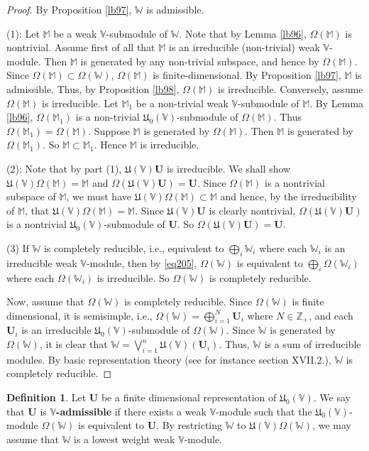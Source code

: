 \documentclass[12pt,b5paper,notitlepage]{report}
\theoremstyle{definition}
\newtheorem{df}{Definition}[section]
\theoremstyle{plain}
\newcommand{\fk}{\mathfrak}
\newcommand{\mbf}{\mathbf}
\newcommand{\Vbb}{\mathbb V}
\newcommand{\Wbb}{\mathbb W}
\newcommand{\Mbb}{\mathbb M}
\newcommand{\Zbb}{\mathbb Z}
\numberwithin{equation}{section}
\begin{document}
\begin{proof}
By Proposition \ref{lb97}, $\Wbb$ is admissible.

(1): Let $\Mbb$ be a weak $\Vbb$-submodule of $\Wbb$. Note that by Lemma \ref{lb96}, $\Omega(\Mbb)$ is nontrivial. Assume first of all that $\Mbb$ is an irreducible (non-trivial) weak $\Vbb$-module. Then $\Mbb$ is generated by any non-trivial subspace, and hence by $\Omega(\Mbb)$. Since $\Omega(\Mbb)\subset\Omega(\Wbb)$, $\Omega(\Mbb)$ is finite-dimensional. By Proposition \ref{lb97}, $\Mbb$ is admissible. Thus, by Proposition \ref{lb98}, $\Omega(\Mbb)$ is irreducible. Conversely, assume $\Omega(\Mbb)$ is irreducible. Let $\Mbb_1$ be a non-trivial weak $\Vbb$-submodule of $\Mbb$. By Lemma \ref{lb96}, $\Omega(\Mbb_1)$ is a non-trivial $\fk U_0(\Vbb)$-submodule of $\Omega(\Mbb)$. Thus $\Omega(\Mbb_1)=\Omega(\Mbb)$. Suppose $\Mbb$ is generated by $\Omega(\Mbb)$. Then $\Mbb$ is generated by $\Omega(\Mbb_1)$. So $\Mbb\subset\Mbb_1$. Hence $\Mbb$ is irreducible.


(2): Note that by part (1), $\fk U(\Vbb)\mbf U$ is irreducible. We shall show $\fk U(\Vbb)\Omega(\Mbb)=\Mbb$ and $\Omega(\fk U(\Vbb)\mbf U)=\mbf U$.  Since $\Omega(\Mbb)$ is a nontrivial subspace of $\Mbb$, we must have $\fk U(\Vbb)\Omega(\Mbb)\subset\Mbb$ and hence, by the irreducibility of $\Mbb$, that $\fk U(\Vbb)\Omega(\Mbb)=\Mbb$. Since $\fk U(\Vbb)\mbf U$ is clearly nontrivial, $\Omega(\fk U(\Vbb)\mbf U)$ is a nontrivial $\fk U_0(\Vbb)$-submodule of $\mbf U$. So $\Omega(\fk U(\Vbb)\mbf U)=\mbf U$.

(3) If $\Wbb$ is completely reducible, i.e., equivalent to $\bigoplus_i\Wbb_i$ where each $\Wbb_i$ is an irreducible weak $\Vbb$-module, then by \eqref{eq205}, $\Omega(\Wbb)$ is equivalent to $\bigoplus_i\Omega(\Wbb_i)$ where each $\Omega(\Wbb_i)$ is irreducible. So $\Omega(\Wbb)$ is completely reducible.

Now, assume that $\Omega(\Wbb)$ is completely reducible. Since  $\Omega(\Wbb)$ is finite dimensional, it is semisimple, i.e., $\Omega(\Wbb)=\bigoplus_{i=1}^N\mbf U_i$ where $N\in\Zbb_+$, and each $\mbf U_i$ is an irreducible $\fk U_0(\Vbb)$-submodule of $\Omega(\Wbb)$. Since $\Wbb$ is generated by $\Omega(\Wbb)$, it is clear that $\Wbb=\bigvee_{i=1}^n \fk U(\Vbb)(\mbf U_i)$. Thus, $\Wbb$ is a sum of irreducible modules. By basic representation theory (see for instance \cite{Lang} section XVII.2.), $\Wbb$ is completely reducible.
\end{proof}

\begin{df}
Let $\mbf U$ be a finite dimensional representation of $\fk U_0(\Vbb)$. We say that $\mbf U$ is \textbf{$\Vbb$-admissible} if there exists a weak $\Vbb$-module such that the $\fk U_0(\Vbb)$-module $\Omega(\Wbb)$ is equivalent to $\mbf U$. By restricting $\Wbb$ to $\fk U(\Vbb)\Omega(\Wbb)$, we may assume that $\Wbb$ is a lowest weight weak $\Vbb$-module.
\end{df}
\end{document}
